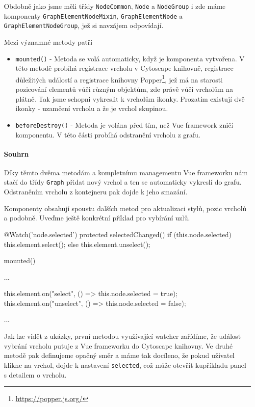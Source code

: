 Obdobně jako jsme měli třídy \texttt{NodeCommon}, \texttt{Node} a \texttt{NodeGroup} i zde máme komponenty \texttt{GraphElementNodeMixin}, \texttt{GraphElementNode} a \\\texttt{GraphElementNodeGroup}, jež si navzájem odpovídají.

Mezi významné metody patří
\begin{itemize}
  \item \texttt{mounted()} - Metoda se volá automaticky, když je komponenta vytvořena. V této metodě probíhá registrace vrcholu v Cytoscape knihovně, registrace důležitých událostí a registrace knihovny Popper\footnote{\url{https://popper.js.org/}}, jež má na starosti pozicování elementů vůči různým objektům, zde právě vůči vrcholům na plátně. Tak jsme schopni vykreslit k vrcholům ikonky. Prozatím existují dvě ikonky - uzamčení vrcholu a že je vrchol skupinou.
  \item \texttt{beforeDestroy()} - Metoda je volána před tím, než Vue framework zničí komponentu. V této části probíhá odstranění vrcholu z grafu.
\end{itemize}

\paragraph{Souhrn} Díky těmto dvěma metodám a kompletnímu managementu Vue frameworku nám stačí do třídy \texttt{Graph} přidat nový vrchol a ten se automaticky vykreslí do grafu. Odstraněním vrcholu z kontejneru pak dojde k jeho smazání.


\newpage
Komponenty obsahují spoustu dalších metod pro aktualizaci stylů, pozic vrcholů a podobně. Uveďme ještě konkrétní příklad pro vybírání uzlů.
\begin{code}
@Watch('node.selected')
protected selectedChanged() {
    if (this.node.selected) {
        this.element.select();
    } else {
        this.element.unselect();
    }
}

mounted() {
    ...

    this.element.on("select", () => this.node.selected = true);
    this.element.on("unselect", () => this.node.selected = false);

    ...
}
\end{code}

Jak lze vidět z ukázky, první metodou využívající watcher zařídíme, že událost vybrání vrcholu putuje z Vue frameworku do Cytoscape knihovny. Ve druhé metodě pak definujeme opačný směr a máme tak docíleno, že pokud uživatel klikne na vrchol, dojde k nastavení \texttt{selected}, což může otevřít kupříkladu panel s detailem o vrcholu.

